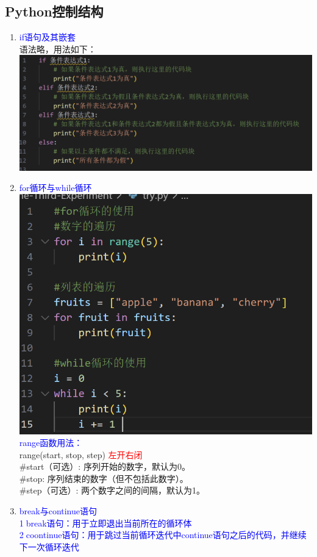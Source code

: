 \documentclass[12pt,a4paper,UTF8]{article}
\begin{document}
    \subsection{Python控制结构}
    \begin{enumerate}
        \item \textcolor{blue}{if语句及其嵌套}\\
        语法略，用法如下：\\
        \includegraphics[scale=0.25]{pictures/11.png}\\
        \item \textcolor{blue}{for循环与while循环}\\
        \includegraphics[scale=0.3]{pictures/12.png}\\
        \textcolor{blue}{range函数用法：}\\
        range(start, stop, step) \textcolor{red}{左开右闭}\\
        \#start（可选）: 序列开始的数字，默认为0。\\
        \#stop: 序列结束的数字（但不包括此数字）。\\
        \#step（可选）: 两个数字之间的间隔，默认为1。\\
        \item \textcolor{blue}{break与continue语句}\\
        \textcolor{blue}{\textcircled{1}break语句：用于立即退出当前所在的循环体}\\
        \textcolor{blue}{\textcircled{2}coontinue语句：用于跳过当前循环迭代中continue语句之后的代码，并继续下一次循环迭代}\\
    \end{enumerate}
\end{document}
